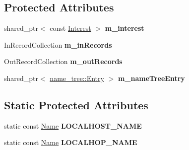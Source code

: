 \subsection*{Protected Attributes}
\begin{DoxyCompactItemize}
\item 
shared\+\_\+ptr$<$ const \hyperlink{classndn_1_1Interest}{Interest} $>$ {\bfseries m\+\_\+interest}\hypertarget{classnfd_1_1pit_1_1Entry_a67de4cf603bb3341a1e750e392b0fc9f}{}\label{classnfd_1_1pit_1_1Entry_a67de4cf603bb3341a1e750e392b0fc9f}

\item 
In\+Record\+Collection {\bfseries m\+\_\+in\+Records}\hypertarget{classnfd_1_1pit_1_1Entry_a989a1e3217cef58cf6b94e7cf7d6a91a}{}\label{classnfd_1_1pit_1_1Entry_a989a1e3217cef58cf6b94e7cf7d6a91a}

\item 
Out\+Record\+Collection {\bfseries m\+\_\+out\+Records}\hypertarget{classnfd_1_1pit_1_1Entry_a5e24e598ff44f2a7553e05721840f3b0}{}\label{classnfd_1_1pit_1_1Entry_a5e24e598ff44f2a7553e05721840f3b0}

\item 
shared\+\_\+ptr$<$ \hyperlink{classnfd_1_1name__tree_1_1Entry}{name\+\_\+tree\+::\+Entry} $>$ {\bfseries m\+\_\+name\+Tree\+Entry}\hypertarget{classnfd_1_1pit_1_1Entry_a8755da0fe6b4154a0a7f09bc05fe2bd1}{}\label{classnfd_1_1pit_1_1Entry_a8755da0fe6b4154a0a7f09bc05fe2bd1}

\end{DoxyCompactItemize}
\subsection*{Static Protected Attributes}
\begin{DoxyCompactItemize}
\item 
static const \hyperlink{classndn_1_1Name}{Name} {\bfseries L\+O\+C\+A\+L\+H\+O\+S\+T\+\_\+\+N\+A\+ME}\hypertarget{classnfd_1_1pit_1_1Entry_a4f09cc02d8a6d25e4967750a324b68ee}{}\label{classnfd_1_1pit_1_1Entry_a4f09cc02d8a6d25e4967750a324b68ee}

\item 
static const \hyperlink{classndn_1_1Name}{Name} {\bfseries L\+O\+C\+A\+L\+H\+O\+P\+\_\+\+N\+A\+ME}\hypertarget{classnfd_1_1pit_1_1Entry_abc171c030af5aa5ec84f89feb08b4de8}{}\label{classnfd_1_1pit_1_1Entry_abc171c030af5aa5ec84f89feb08b4de8}

\end{DoxyCompactItemize}
